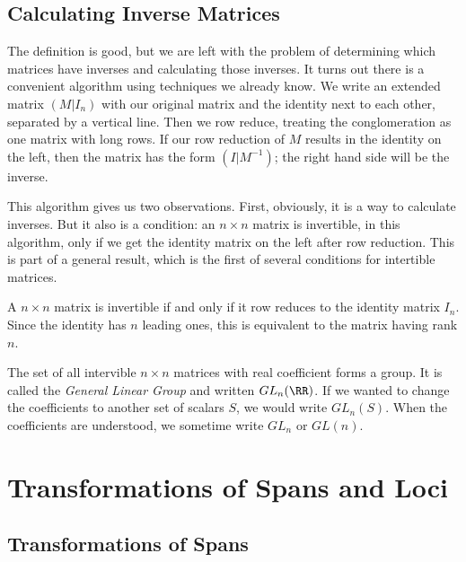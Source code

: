 \documentclass[fleqn]{report}
\begin{document}
\subsection{Calculating Inverse Matrices}
\label{calculation-inverse-matrices}

The definition is good, but we are left with the problem of
determining which matrices have inverses and calculating those
inverses. It turns out there is a convenient algorithm using
techniques we already know. We write an extended matrix
$(M|I_n)$ with our original matrix and the identity next to
each other, separated by a vertical line. Then we row reduce,
treating the conglomeration as one matrix with long rows.
If our row reduction of $M$ results in the identity on the
left, then the matrix has the form $(I|M^{-1})$; the right
hand side will be the inverse.

This algorithm gives us two observations. First, obviously,
it is a way to calculate inverses. But it also is a
condition: an $n \times n$ matrix is invertible, in this
algorithm, only if we get the identity matrix on the left after
row reduction. This is part of a general result, which is the
first of several conditions for intertible matrices.

\begin{prop}
A $n \times n$ matrix is invertible if and only if it row
reduces to the identity matrix $I_n$. Since the identity has
$n$ leading ones, this is equivalent to the matrix having rank
$n$.
\end{prop}

\begin{defn}
The set of all intervible $n \times n$ matrices with real
coefficient forms a group. It is called the \emph{General
Linear Group} and written $GL_n(\RR)$. If we wanted to change
the coefficients to another set of scalars $S$, we would write
$GL_n(S)$. When the coefficients are understood, we sometime
write $GL_n$ or $GL(n)$.
\end{defn}

\section{Transformations of Spans and Loci}
\label{transformations-of-spans-and-loci}

\subsection{Transformations of Spans}
\label{transformations-of-spans}
\end{document}
